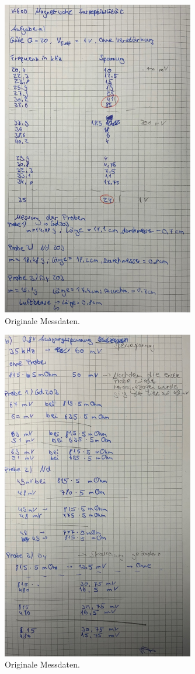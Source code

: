 \begin{figure}[H]
    \centering
    \includegraphics[width=0.75\textwidth]{data/origDaten1.jpg}
    \caption{Originale Messdaten.}
    \label{fig:daten1}
\end{figure}

\begin{figure}[H]
    \centering
    \includegraphics[width=0.75\textwidth]{data/origDaten2.jpg}
    \caption{Originale Messdaten.}
    \label{fig:daten2}
\end{figure}